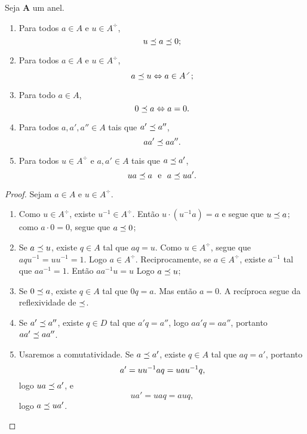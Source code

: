 \begin{proposition}
Seja $\bm A$ um anel.
	\begin{enumerate}
	\item Para todos $a \in A$ e $u \in A^{\div}$,
		\begin{equation*}
		u \preceq a \preceq 0;
		\end{equation*}
	\item Para todos $a \in A$ e $u \in A^{\div}$,
		\begin{equation*}
		a \dleq u \Leftrightarrow a \in A^{\div};
		\end{equation*}
	\item Para todo $a \in A$,
		\begin{equation*}
		0 \preceq a \Leftrightarrow a=0.
		\end{equation*}
	\item Para todos $a,a',a'' \in A$ tais que $a' \preceq a''$,
		\begin{equation*}
		aa' \preceq aa''.
		\end{equation*}
	\item Para todos $u \in A^{\div}$ e $a,a' \in A$ tais que $a \preceq a'$,
		\begin{equation*}
		ua \preceq a \text{\ \ e\ \ } a \preceq ua'.
		\end{equation*}
	\end{enumerate}
\end{proposition}
\begin{proof} Sejam $a \in A$ e $u \in A^{\div}$.
	\begin{enumerate}
	\item Como $u \in A^{\div}$, existe $u^{-1} \in A^{\div}$. Então $u\cdot(u^{-1}a) = a$ e segue que $u \preceq a$; como $a \cdot 0 = 0$, segue que $a \preceq 0$;
	\item Se $a \preceq u$, existe $q \in A$ tal que $aq=u$. Como $u \in A^{\div}$, segue que $aqu^{-1}=uu^{-1}=1$. Logo $a \in A^{\div}$. Reciprocamente, se $a \in A^{\div}$, existe $a^{-1}$ tal que $aa^{-1}=1$. Então $aa^{-1}u=u$ Logo $a \preceq u$;
	\item Se $0 \preceq a$, existe $q \in A$ tal que $0q=a$. Mas então $a=0$. A recíproca segue da reflexividade de $\preceq$.
	\item Se $a' \preceq a''$, existe $q \in D$ tal que $a'q=a''$, logo $aa'q=aa''$, portanto $aa' \preceq aa''$.
	\item Usaremos a comutatividade. Se $a \preceq a'$, existe $q \in A$ tal que $aq=a'$, portanto
		\begin{equation*}
		a' = uu^{-1} aq = uau^{-1} q,
		\end{equation*}
logo $ua \preceq a'$, e
		\begin{equation*}
		ua' = uaq = auq,
		\end{equation*}
logo $a \preceq ua'$.
	 \qedhere
	\end{enumerate}
\end{proof}

